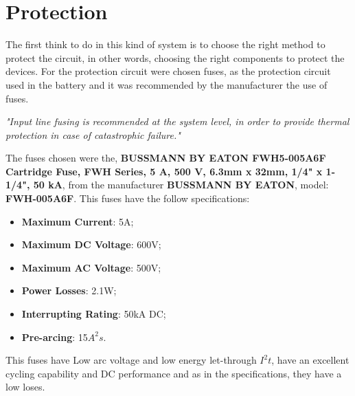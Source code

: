 \section{Protection}
The first think to do in this kind of system is to choose the right method to protect the circuit, in other words, choosing the right components to protect the devices. For the protection circuit were chosen fuses, as the protection circuit used in the battery and it was recommended by the manufacturer the use of fuses.
\begin{center}
\textit{"Input line fusing is recommended at the system level, in order to provide thermal protection in case of catastrophic failure."}
\end{center}
The fuses chosen were the, \textbf{BUSSMANN BY EATON  FWH5-005A6F  Cartridge Fuse, FWH Series, 5 A, 500 V, 6.3mm x 32mm, 1/4" x 1-1/4", 50 kA}, from the manufacturer \textbf{BUSSMANN BY EATON}, model: \textbf{FWH-005A6F}. This fuses have the follow specifications:
\begin{itemize}
	\item \textbf{Maximum Current}: 5A;
	\item \textbf{Maximum DC Voltage}: 600V;
	\item \textbf{Maximum AC Voltage}: 500V;
	\item \textbf{Power Losses}: 2.1W;
	\item \textbf{Interrupting Rating}: 50kA DC;
	\item \textbf{Pre-arcing}: 15\(A^2s\).
\end{itemize}
This fuses have Low arc voltage and low energy let-through \(I^2t\), have an excellent cycling capability and DC performance and as in the specifications, they have a low loses.\par

